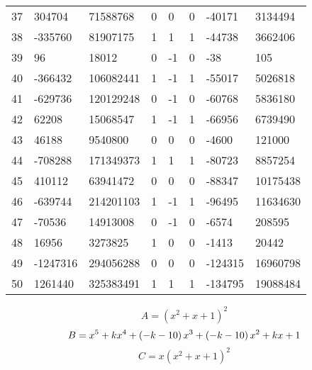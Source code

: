 \documentclass{amsart}
\begin{document}
\begin{longtable}{|l|l|l|lllll|}
37&304704&71588768&0&0&0&-40171&3134494\\
38&-335760&81907175&1&1&1&-44738&3662406\\
39&96&18012&0&-1&0&-38&105\\
40&-366432&106082441&1&-1&1&-55017&5026818\\
41&-629736&120129248&0&-1&0&-60768&5836180\\
42&62208&15068547&1&-1&1&-66956&6739490\\
43&46188&9540800&0&0&0&-4600&121000\\
44&-708288&171349373&1&1&1&-80723&8857254\\
45&410112&63941472&0&0&0&-88347&10175438\\
46&-639744&214201103&1&-1&1&-96495&11634630\\
47&-70536&14913008&0&-1&0&-6574&208595\\
48&16956&3273825&1&0&0&-1413&20442\\
49&-1247316&294056288&0&0&0&-124315&16960798\\
50&1261440&325383491&1&1&1&-134795&19088484\\
\hline
\end{longtable}
$$A=(x^2
 + x
 + 1)^{2}$$
$$B=x^5
 + k\*x^4
 + \left(-k
 - 10\right) \*x^3
 + \left(-k
 - 10\right) \*x^2
 + k\*x
 + 1$$
$$C=x(x^2
 + x
 + 1)^{2}$$
\end{document}
